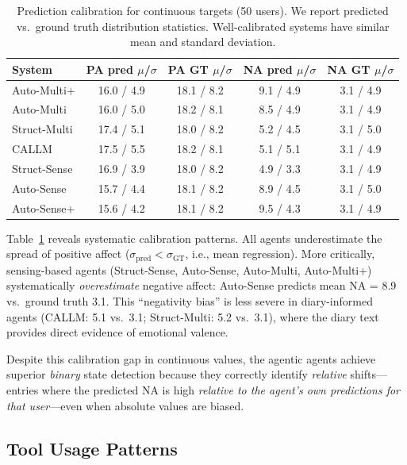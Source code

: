 \documentclass[screen,review,anonymous]{acmart}
\begin{document}
\begin{table}[t]
\caption{Prediction calibration for continuous targets (50 users). We report predicted vs.\ ground truth distribution statistics. Well-calibrated systems have similar mean and standard deviation.}
\label{tab:calibration}
\small
\begin{tabular}{l cccc}
\toprule
\textbf{System} & \textbf{PA pred $\mu$/$\sigma$} & \textbf{PA GT $\mu$/$\sigma$} & \textbf{NA pred $\mu$/$\sigma$} & \textbf{NA GT $\mu$/$\sigma$} \\
\midrule
Auto-Multi+ & 16.0 / 4.9 & 18.1 / 8.2 & 9.1 / 4.9 & 3.1 / 4.9 \\
Auto-Multi & 16.0 / 5.0 & 18.2 / 8.1 & 8.5 / 4.9 & 3.1 / 4.9 \\
Struct-Multi & 17.4 / 5.1 & 18.0 / 8.2 & 5.2 / 4.5 & 3.1 / 5.0 \\
CALLM & 17.5 / 5.5 & 18.2 / 8.1 & 5.1 / 5.1 & 3.1 / 4.9 \\
Struct-Sense & 16.9 / 3.9 & 18.0 / 8.2 & 4.9 / 3.3 & 3.1 / 4.9 \\
Auto-Sense & 15.7 / 4.4 & 18.1 / 8.2 & 8.9 / 4.5 & 3.1 / 5.0 \\
Auto-Sense+ & 15.6 / 4.2 & 18.1 / 8.2 & 9.5 / 4.3 & 3.1 / 4.9 \\
\bottomrule
\end{tabular}
\end{table}

Table~\ref{tab:calibration} reveals systematic calibration patterns. All agents underestimate the spread of positive affect ($\sigma_{\text{pred}} < \sigma_{\text{GT}}$, i.e., mean regression). More critically, sensing-based agents (Struct-Sense, Auto-Sense, Auto-Multi, Auto-Multi+) systematically \emph{overestimate} negative affect: Auto-Sense predicts mean NA = 8.9 vs.\ ground truth 3.1. This ``negativity bias'' is less severe in diary-informed agents (CALLM: 5.1 vs.\ 3.1; Struct-Multi: 5.2 vs.\ 3.1), where the diary text provides direct evidence of emotional valence.

Despite this calibration gap in continuous values, the agentic agents achieve superior \emph{binary} state detection because they correctly identify \emph{relative} shifts---entries where the predicted NA is high \emph{relative to the agent's own predictions for that user}---even when absolute values are biased.

\subsection{Tool Usage Patterns}
\label{sec:tool_usage}
\end{document}
